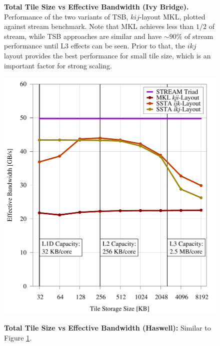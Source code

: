 \documentclass{sig-alternate-05-2015}
\begin{document}
\begin{figure}[!bth]
  \captionsetup{width=0.39\textwidth}
  \centering
  \begin{minipage}{0.49\textwidth}
    \centering
    \caption{
      \textbf{Total Tile Size vs Effective Bandwidth (Ivy Bridge).}
      Performance of the two variants of TSB, \(kij\)-layout MKL, plotted
      against stream benchmark. Note that MKL achieves less than $1/2$ of
      stream, while TSB approaches are similar and have ${\sim}90\%$ of stream 
      performance until L3 effects can be seen. Prior to that, the 
      \(ikj\) layout provides the best performance for small tile size,
      which is an important factor for strong scaling.
    }
    \label{fig:results:tile_size_ivb}
    \includegraphics[width=0.99\columnwidth]{figures/post_tsb_tw_sweep_full_matrix_double_precision_production_edison_ivb_e5_2695_v2_08_31_2016_09_03_2016_12pus.pdf}
    \label{fig:results:tile_size_ivb}
  \end{minipage}
  \begin{minipage}{0.49\textwidth}
    \centering
    \caption{
      \textbf{Total Tile Size vs Effective Bandwidth (Haswell):}
      Similar to Figure \ref{fig:results:tile_size_ivb}. 
}
\end{minipage}
\end{figure}
\end{document}
